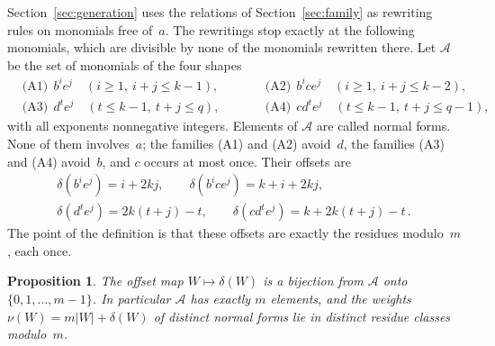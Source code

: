 \documentclass[11pt,letterpaper]{article}
\numberwithin{equation}{section}
\theoremstyle{plain}
\newtheorem{proposition}[theorem]{Proposition}
\theoremstyle{remark}
\newcommand{\NF}{\mathcal{A}}
\newcommand{\len}[1]{\lvert #1\rvert}
\begin{document}
Section~\ref{sec:generation} uses the relations of Section~\ref{sec:family} as rewriting rules on monomials free of~$a$. The rewritings stop exactly at the following monomials, which are divisible by none of the monomials rewritten there. Let $\NF$ be the set of monomials of the four shapes
\begin{equation}\label{eq:NF}
\begin{aligned}
&\text{(A1)}\ \ b^{i}e^{j} \quad (i\ge 1,\ i+j\le k-1), &\qquad& \text{(A2)}\ \ b^{i}ce^{j} \quad (i\ge 1,\ i+j\le k-2),\\
&\text{(A3)}\ \ d^{t}e^{j} \quad (t\le k-1,\ t+j\le q), && \text{(A4)}\ \ cd^{t}e^{j} \quad (t\le k-1,\ t+j\le q-1),
\end{aligned}
\end{equation}
with all exponents nonnegative integers. Elements of $\NF$ are called normal forms. None of them involves~$a$; the families (A1) and (A2) avoid~$d$, the families (A3) and (A4) avoid~$b$, and $c$ occurs at most once. Their offsets are
\begin{equation}\label{eq:NFoffsets}
\begin{gathered}
\delta(b^ie^j)=i+2kj,\qquad \delta(b^ice^j)=k+i+2kj,\\
\delta(d^te^j)=2k(t+j)-t,\qquad \delta(cd^te^j)=k+2k(t+j)-t\,.
\end{gathered}
\end{equation}
The point of the definition is that these offsets are exactly the residues modulo~$m$, each once.

\begin{proposition}\label{prop:normal}
The offset map $W\mapsto\delta(W)$ is a bijection from $\NF$ onto $\{0,1,\dots,m-1\}$. In particular $\NF$ has exactly $m$ elements, and the weights $\nu(W)=m\len{W}+\delta(W)$ of distinct normal forms lie in distinct residue classes modulo~$m$.
\end{proposition}
\end{document}
